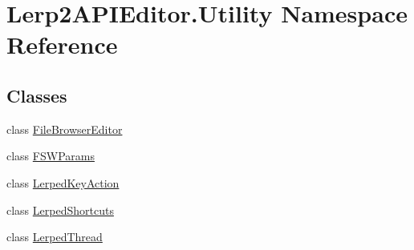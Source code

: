 \hypertarget{namespace_lerp2_a_p_i_editor_1_1_utility}{}\section{Lerp2\+A\+P\+I\+Editor.\+Utility Namespace Reference}
\label{namespace_lerp2_a_p_i_editor_1_1_utility}
\subsection*{Classes}
\begin{DoxyCompactItemize}
\item 
class \hyperlink{class_lerp2_a_p_i_editor_1_1_utility_1_1_file_browser_editor}{File\+Browser\+Editor}
\item 
class \hyperlink{class_lerp2_a_p_i_editor_1_1_utility_1_1_f_s_w_params}{F\+S\+W\+Params}
\item 
class \hyperlink{class_lerp2_a_p_i_editor_1_1_utility_1_1_lerped_key_action}{Lerped\+Key\+Action}
\item 
class \hyperlink{class_lerp2_a_p_i_editor_1_1_utility_1_1_lerped_shortcuts}{Lerped\+Shortcuts}
\item 
class \hyperlink{class_lerp2_a_p_i_editor_1_1_utility_1_1_lerped_thread}{Lerped\+Thread}
\end{DoxyCompactItemize}
